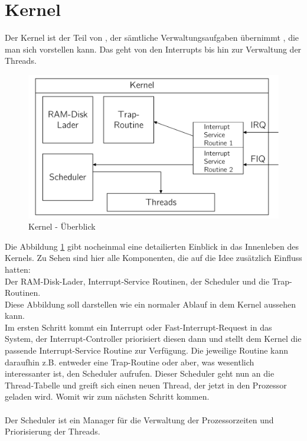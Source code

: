 \section{Kernel}
Der Kernel ist der Teil von \mops, der s\"amtliche Verwaltungsaufgaben \"ubernimmt , die man sich vorstellen kann. Das geht von den Interrupts bis hin zur Verwaltung der Threads.
\begin{figure}[h!]
	\centering
	\includegraphics[scale=0.60]{common/draft-kernel.pdf}	
	\caption{Kernel - \"Uberblick}
	\label{draft:draft-kernel}
\end{figure}\newpage\noindent
Die Abbildung \ref{draft:draft-kernel} gibt nocheinmal eine detailierten Einblick in das Innenleben des Kernels. Zu Sehen sind hier alle Komponenten, die auf die Idee zus\"atzlich Einfluss hatten:\\ Der RAM-Disk-Lader, Interrupt-Service Routinen, der Scheduler und die Trap-Routinen. \\Diese Abbildung soll darstellen wie ein normaler Ablauf in dem Kernel aussehen kann. \\
Im ersten Schritt kommt ein Interrupt oder Fast-Interrupt-Request in das System, der Interrupt-Controller priorisiert diesen dann und stellt dem Kernel die passende Interrupt-Service Routine zur Verf\"ugung. Die jeweilige Routine kann daraufhin z.B. entweder eine Trap-Routine oder aber, was wesentlich interessanter ist, den Scheduler aufrufen. Dieser Scheduler geht nun an die Thread-Tabelle und greift sich einen neuen Thread, der jetzt in den Prozessor geladen wird. Womit wir zum n\"achsten Schritt kommen.\\ \\
Der Scheduler ist ein Manager f\"ur die Verwaltung der Prozessorzeiten und Priorisierung der Threads.
